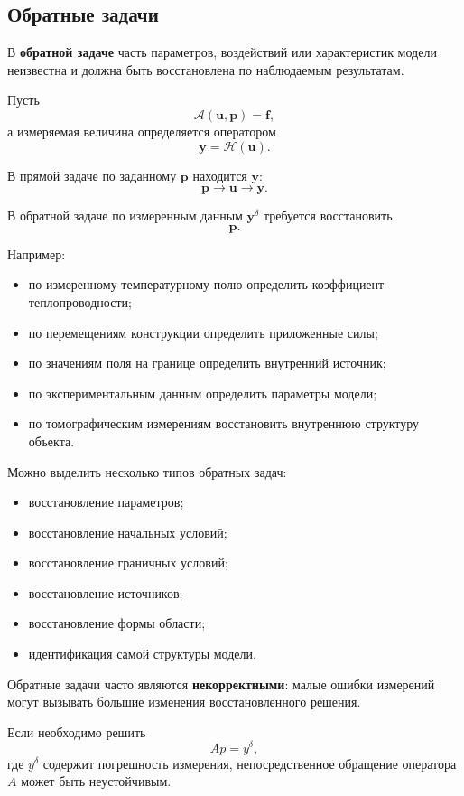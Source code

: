 \subsection{Обратные задачи}

В \textbf{обратной задаче} часть параметров, воздействий или характеристик
модели неизвестна и должна быть восстановлена по наблюдаемым результатам.

Пусть
\[
\mathcal{A}(\mathbf{u},\mathbf{p})=\mathbf{f},
\]
а измеряемая величина определяется оператором
\[
\mathbf{y}=\mathcal{H}(\mathbf{u}).
\]

В прямой задаче по заданному $\mathbf{p}$ находится $\mathbf{y}$:
\[
\mathbf{p}\longrightarrow\mathbf{u}
\longrightarrow\mathbf{y}.
\]

В обратной задаче по измеренным данным $\mathbf{y}^{\delta}$ требуется
восстановить
\[
\mathbf{p}.
\]

Например:
\begin{itemize}
	\item по измеренному температурному полю определить коэффициент
	теплопроводности;
	\item по перемещениям конструкции определить приложенные силы;
	\item по значениям поля на границе определить внутренний источник;
	\item по экспериментальным данным определить параметры модели;
	\item по томографическим измерениям восстановить внутреннюю структуру объекта.
\end{itemize}

Можно выделить несколько типов обратных задач:
\begin{itemize}
	\item восстановление параметров;
	\item восстановление начальных условий;
	\item восстановление граничных условий;
	\item восстановление источников;
	\item восстановление формы области;
	\item идентификация самой структуры модели.
\end{itemize}

Обратные задачи часто являются \textbf{некорректными}: малые ошибки измерений
могут вызывать большие изменения восстановленного решения.

Если необходимо решить
\[
A p = y^{\delta},
\]
где $y^{\delta}$ содержит погрешность измерения, непосредственное обращение
оператора $A$ может быть неустойчивым.

